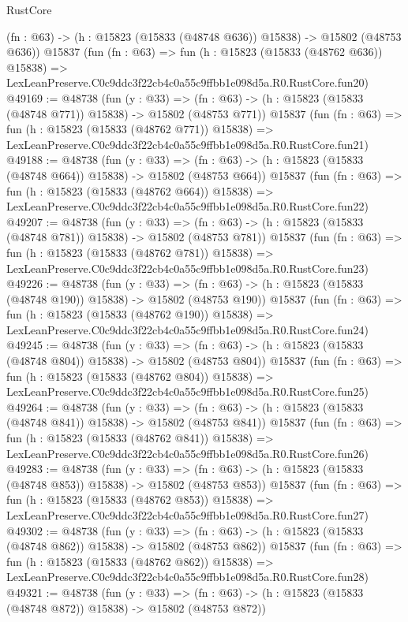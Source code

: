 \begin{lexlean}{RustCore}
\begin{coremodule}
    (fn : @63) -> (h : @15823 (@15833 (@48748 @636)) @15838) -> @15802 (@48753 @636))
    @15837
    (fun (fn : @63) =>
    fun (h : @15823 (@15833 (@48762 @636)) @15838) =>
    LexLeanPreserve.C0c9ddc3f22cb4c0a55c9ffbb1e098d5a.R0.RustCore.fun20)
@49169 := @48738
    (fun (y : @33) =>
    (fn : @63) -> (h : @15823 (@15833 (@48748 @771)) @15838) -> @15802 (@48753 @771))
    @15837
    (fun (fn : @63) =>
    fun (h : @15823 (@15833 (@48762 @771)) @15838) =>
    LexLeanPreserve.C0c9ddc3f22cb4c0a55c9ffbb1e098d5a.R0.RustCore.fun21)
@49188 := @48738
    (fun (y : @33) =>
    (fn : @63) -> (h : @15823 (@15833 (@48748 @664)) @15838) -> @15802 (@48753 @664))
    @15837
    (fun (fn : @63) =>
    fun (h : @15823 (@15833 (@48762 @664)) @15838) =>
    LexLeanPreserve.C0c9ddc3f22cb4c0a55c9ffbb1e098d5a.R0.RustCore.fun22)
@49207 := @48738
    (fun (y : @33) =>
    (fn : @63) -> (h : @15823 (@15833 (@48748 @781)) @15838) -> @15802 (@48753 @781))
    @15837
    (fun (fn : @63) =>
    fun (h : @15823 (@15833 (@48762 @781)) @15838) =>
    LexLeanPreserve.C0c9ddc3f22cb4c0a55c9ffbb1e098d5a.R0.RustCore.fun23)
@49226 := @48738
    (fun (y : @33) =>
    (fn : @63) -> (h : @15823 (@15833 (@48748 @190)) @15838) -> @15802 (@48753 @190))
    @15837
    (fun (fn : @63) =>
    fun (h : @15823 (@15833 (@48762 @190)) @15838) =>
    LexLeanPreserve.C0c9ddc3f22cb4c0a55c9ffbb1e098d5a.R0.RustCore.fun24)
@49245 := @48738
    (fun (y : @33) =>
    (fn : @63) -> (h : @15823 (@15833 (@48748 @804)) @15838) -> @15802 (@48753 @804))
    @15837
    (fun (fn : @63) =>
    fun (h : @15823 (@15833 (@48762 @804)) @15838) =>
    LexLeanPreserve.C0c9ddc3f22cb4c0a55c9ffbb1e098d5a.R0.RustCore.fun25)
@49264 := @48738
    (fun (y : @33) =>
    (fn : @63) -> (h : @15823 (@15833 (@48748 @841)) @15838) -> @15802 (@48753 @841))
    @15837
    (fun (fn : @63) =>
    fun (h : @15823 (@15833 (@48762 @841)) @15838) =>
    LexLeanPreserve.C0c9ddc3f22cb4c0a55c9ffbb1e098d5a.R0.RustCore.fun26)
@49283 := @48738
    (fun (y : @33) =>
    (fn : @63) -> (h : @15823 (@15833 (@48748 @853)) @15838) -> @15802 (@48753 @853))
    @15837
    (fun (fn : @63) =>
    fun (h : @15823 (@15833 (@48762 @853)) @15838) =>
    LexLeanPreserve.C0c9ddc3f22cb4c0a55c9ffbb1e098d5a.R0.RustCore.fun27)
@49302 := @48738
    (fun (y : @33) =>
    (fn : @63) -> (h : @15823 (@15833 (@48748 @862)) @15838) -> @15802 (@48753 @862))
    @15837
    (fun (fn : @63) =>
    fun (h : @15823 (@15833 (@48762 @862)) @15838) =>
    LexLeanPreserve.C0c9ddc3f22cb4c0a55c9ffbb1e098d5a.R0.RustCore.fun28)
@49321 := @48738
    (fun (y : @33) =>
    (fn : @63) -> (h : @15823 (@15833 (@48748 @872)) @15838) -> @15802 (@48753 @872))

\end{coremodule}
\end{lexlean}
